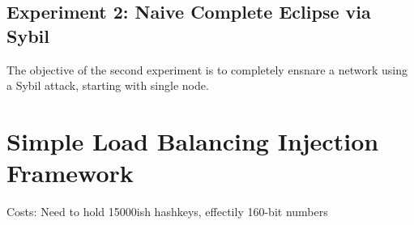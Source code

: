 \documentclass[10pt,a4paper]{article}
\begin{document}
\subsection{Experiment 2:  Naive Complete Eclipse via Sybil}
The objective of the second experiment is to completely ensnare a network using a Sybil attack, starting with single node.



\section{Simple Load Balancing Injection Framework}

Costs:  Need to hold 15000ish hashkeys, effectily 160-bit numbers



\end{document}
